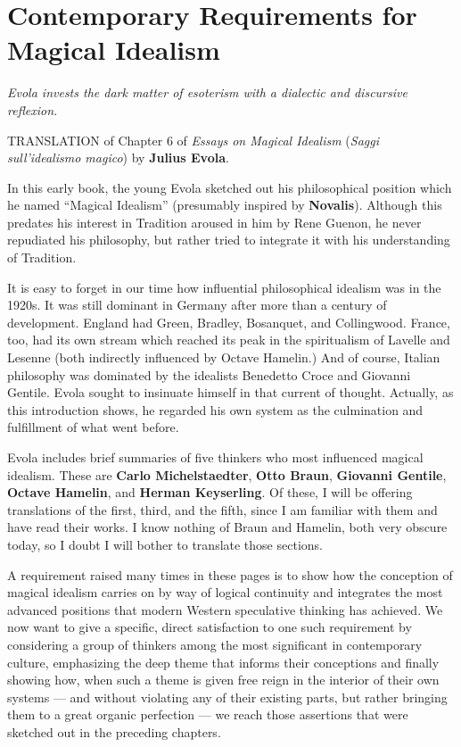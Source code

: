 \section{Contemporary Requirements for Magical Idealism}

\begin{quotex}
\emph{Evola invests the dark matter of esoterism with a dialectic and discursive reflexion}. 
\end{quotex}


\begin{quotationx}
TRANSLATION of Chapter 6 of \emph{Essays on Magical Idealism} (\emph{Saggi sull'idealismo magico}) by \textbf{Julius Evola}.

In this early book, the young Evola sketched out his philosophical position which he named ``Magical Idealism'' (presumably inspired by \textbf{Novalis}). Although this predates his interest in Tradition aroused in him by Rene Guenon, he never repudiated his philosophy, but rather tried to integrate it with his understanding of Tradition.

It is easy to forget in our time how influential philosophical idealism was in the 1920s. It was still dominant in Germany after more than a century of development. England had Green, Bradley, Bosanquet, and Collingwood. France, too, had its own stream which reached its peak in the spiritualism of Lavelle and Lesenne (both indirectly influenced by Octave Hamelin.) And of course, Italian philosophy was dominated by the idealists Benedetto Croce and Giovanni Gentile. Evola sought to insinuate himself in that current of thought. Actually, as this introduction shows, he regarded his own system as the culmination and fulfillment of what went before.

Evola includes brief summaries of five thinkers who most influenced magical idealism. These are \textbf{Carlo Michelstaedter}, \textbf{Otto Braun}, \textbf{Giovanni Gentile}, \textbf{Octave Hamelin}, and \textbf{Herman Keyserling}. Of these, I will be offering translations of the first, third, and the fifth, since I am familiar with them and have read their works. I know nothing of Braun and Hamelin, both very obscure today, so I doubt I will bother to translate those sections.
\end{quotationx}


A requirement raised many times in these pages is to show how the conception of magical idealism carries on by way of logical continuity and integrates the most advanced positions that modern Western speculative thinking has achieved. We now want to give a specific, direct satisfaction to one such requirement by considering a group of thinkers among the most significant in contemporary culture, emphasizing the deep theme that informs their conceptions and finally showing how, when such a theme is given free reign in the interior of their own systems --- and without violating any of their existing parts, but rather bringing them to a great organic perfection --- we reach those assertions that were sketched out in the preceding chapters.

